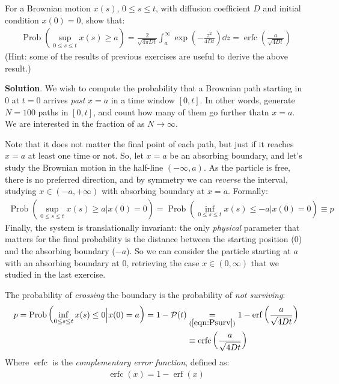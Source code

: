\documentclass[../template.tex]{subfiles}
\begin{document}
\begin{exo}
    For a Brownian motion $x(s)$, $0\leq s \leq t$, with diffusion coefficient $D$ and initial condition $x(0) = 0$, show that:
    \begin{align*}
        \operatorname{Prob}\left(\sup_{0 \leq s \leq t} x(s) \geq a \right) = \frac{2}{\sqrt{4 \pi D t }} \int_a^{\infty} \exp\left(-\frac{z^2}{4 Dt } \right) \dd{z} = \operatorname{erfc}\left(\frac{a}{\sqrt{4 D t}} \right) 
    \end{align*}  
    (Hint: some of the results of previous exercises are useful to derive the above result.)

    \medskip

    \textbf{Solution}. We wish to compute the probability that a Brownian path starting in $0$ at $t=0$ arrives \textit{past} $x=a$ in a time window $[0,t]$. In other words, generate $N=100$ paths in $[0,t]$, and count how many of them go further thatn $x=a$. We are interested in the fraction of  as $N \to \infty$. 
    
    \medskip

    Note that it does not matter the final point of each path, but just if it reaches $x=a$ at least one time or not. So, let $x=a$ be an absorbing boundary, and let's study the Brownian motion in the half-line $(-\infty,a)$. As the particle is free, there is no preferred direction, and by symmetry we can \textit{reverse} the interval, studying $x \in (-a,+\infty)$ with absorbing boundary at $x=a$. Formally:
    \begin{align*}
        \operatorname{Prob}\left(\sup_{0 \leq s \leq t} x(s) \geq a \Big| x(0) = 0\right) = \operatorname{Prob}\left(\inf_{0 \leq s \leq t} x(s)\leq -a\Big| x(0) = 0\right) \equiv p
    \end{align*}
    Finally, the system is translationally invariant: the only \textit{physical} parameter that matters for the final probability is the distance between the starting position ($0$) and the absorbing boundary ($-a$). So we can consider the particle starting at $a$ with an absorbing boundary at $0$, retrieving the case $x \in (0,\infty)$ that we studied in the last exercise.
    
    The probability of \textit{crossing} the boundary is the probability of \textit{not surviving}:
    \begin{align*}
        p = \operatorname{Prob}\left(\inf_{0 \leq s \leq t}x(s) \leq 0\Big|x(0) = a\right)  = 1-\mathcal{P}(t) &\underset{(\ref{eqn:Psurv})}{=} 1-\operatorname{erf}\left(\frac{a}{\sqrt{4 D t}} \right)\\
        & \equiv \operatorname{erfc}\left(\frac{a}{\sqrt{4Dt}} \right) 
    \end{align*}  
    Where $\operatorname{erfc}$ is the \textit{complementary error function}, defined as:
    \begin{align*}
        \operatorname{erfc}(x) = 1-\operatorname{erf}(x)  
    \end{align*}  
\end{exo}
\end{document}
